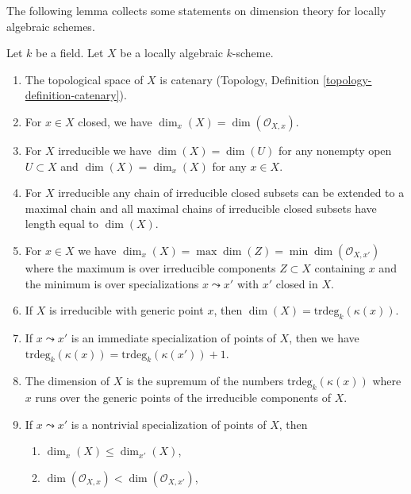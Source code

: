 \noindent
The following lemma collects some statements on dimension theory for locally
algebraic schemes.

\begin{lemma}
\label{lemma-dimension-locally-algebraic}
\begin{reference}
\cite[Chapter II, \S 1, no. 36, p. 230]{FAC}
\end{reference}
Let $k$ be a field. Let $X$ be a locally algebraic $k$-scheme.
\begin{enumerate}
\item
\label{item-catenary}
The topological space of $X$ is catenary
(Topology, Definition \ref{topology-definition-catenary}).
\item
\label{item-dimension-at-closed-point}
For $x \in X$ closed, we have $\dim_x(X) = \dim(\mathcal{O}_{X, x})$.
\item
\label{item-dimension-irreducible}
For $X$ irreducible we have $\dim(X) = \dim(U)$ for any
nonempty open $U \subset X$ and $\dim(X) = \dim_x(X)$
for any $x \in X$.
\item
\label{item-irreducible-maximal-chains}
For $X$ irreducible any chain of irreducible closed subsets can be
extended to a maximal chain and all maximal chains of irreducible
closed subsets have length equal to $\dim(X)$.
\item
\label{item-dimension-irreducibles-passing-through}
For $x \in X$ we have
$\dim_x(X) = \max \dim(Z) = \min \dim(\mathcal{O}_{X, x'})$
where the maximum is over irreducible components
$Z \subset X$ containing $x$ and the minimum is over
specializations $x \leadsto x'$ with $x'$ closed in $X$.
\item
\label{item-dimension-irreducible-trdeg}
If $X$ is irreducible with generic point $x$, then
$\dim(X) = \text{trdeg}_k(\kappa(x))$.
\item
\label{item-immediate-specialization}
If $x \leadsto x'$ is an immediate specialization
of points of $X$, then we have
$\text{trdeg}_k(\kappa(x)) = \text{trdeg}_k(\kappa(x')) + 1$.
\item
\label{item-dimension-sup-trdeg}
The dimension of $X$ is the supremum of the numbers
$\text{trdeg}_k(\kappa(x))$ where $x$ runs over the
generic points of the irreducible components of $X$.
\item
\label{item-specialization}
If $x \leadsto x'$ is a nontrivial specialization of points of $X$, then
\begin{enumerate}
\item $\dim_x(X) \leq \dim_{x'}(X)$,
\item $\dim(\mathcal{O}_{X, x}) < \dim(\mathcal{O}_{X, x'})$,

\end{enumerate}
\end{enumerate}
\end{lemma}
